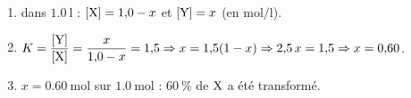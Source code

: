 \documentclass[11pt,a4paper]{article}
\begin{document}
\begin{corrige}
\begin{enumerate}[label=\alph*)]
  \item dans $\qty{1.0}{\litre}$ : $[\ce{X}]=1{,}0-x$ et $[\ce{Y}]=x$ (en $\si{\mol\per\litre}$).
  \item $K = \dfrac{[\ce{Y}]}{[\ce{X}]} = \dfrac{x}{1{,}0-x} = 1{,}5 \Rightarrow x = 1{,}5(1-x) \Rightarrow 2{,}5\,x = 1{,}5 \Rightarrow x = 0{,}60$.
  \item $x = \qty{0.60}{\mol}$ sur $\qty{1.0}{\mol}$ : \; $\qty{60}{\percent}$ de $\ce{X}$ a été transformé.
\end{enumerate}
\end{corrige}
\end{document}
